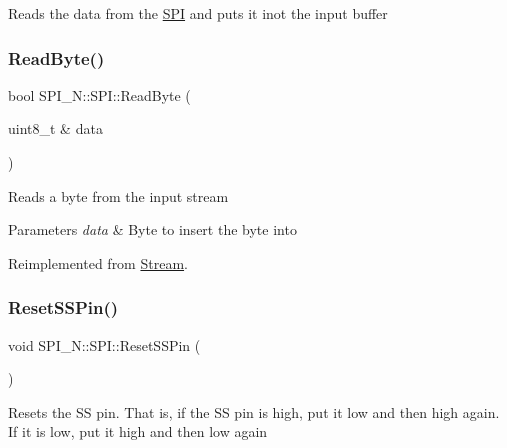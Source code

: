 Reads the data from the \hyperlink{class_s_p_i___n_1_1_s_p_i}{S\+PI} and puts it inot the input buffer \hypertarget{class_s_p_i___n_1_1_s_p_i_a57ee9af74ec6a2d37001674f37f46344}{}\label{class_s_p_i___n_1_1_s_p_i_a57ee9af74ec6a2d37001674f37f46344} 
\subsubsection{\texorpdfstring{Read\+Byte()}{ReadByte()}}
{\footnotesize\ttfamily bool S\+P\+I\+\_\+\+N\+::\+S\+P\+I\+::\+Read\+Byte (\begin{DoxyParamCaption}\item[{uint8\+\_\+t \&}]{data }\end{DoxyParamCaption})\hspace{0.3cm}{\ttfamily [virtual]}}

Reads a byte from the input stream 
\begin{DoxyParams}{Parameters}
{\em data} & Byte to insert the byte into \\
\hline
\end{DoxyParams}


Reimplemented from \hyperlink{class_stream_a6db4180f5834073f992608b856bddca2}{Stream}.

\hypertarget{class_s_p_i___n_1_1_s_p_i_a6daa4720c8710e177f71ac318b96a3f8}{}\label{class_s_p_i___n_1_1_s_p_i_a6daa4720c8710e177f71ac318b96a3f8} 
\subsubsection{\texorpdfstring{Reset\+S\+S\+Pin()}{ResetSSPin()}}
{\footnotesize\ttfamily void S\+P\+I\+\_\+\+N\+::\+S\+P\+I\+::\+Reset\+S\+S\+Pin (\begin{DoxyParamCaption}{ }\end{DoxyParamCaption})}

Resets the SS pin. That is, if the SS pin is high, put it low and then high again. If it is low, put it high and then low again \hypertarget{class_s_p_i___n_1_1_s_p_i_a3e2e2a7f02ffa5003548a1b9d820ce9a}{}\label{class_s_p_i___n_1_1_s_p_i_a3e2e2a7f02ffa5003548a1b9d820ce9a} 
